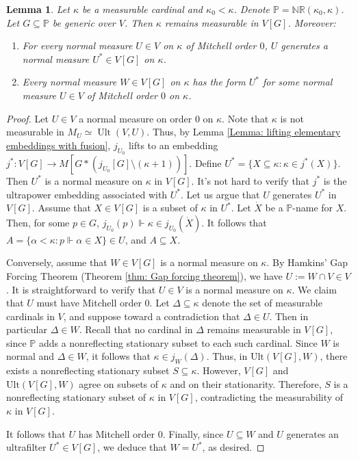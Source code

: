\documentclass[11pt]{amsart}
\newtheorem{lemma}[theorem]{Lemma}
\theoremstyle{definition}
\theoremstyle{remark}
\newcommand\<{{<}}
\DeclareMathOperator{\Ult}{Ult}
\newcommand{\po}{\mathbb{P}}
\begin{document}
\begin{lemma} \label{lemma: normal measures after iterating NRs}
    Let $\kappa$ be a measurable cardinal and  $\kappa_0<\kappa$. Denote $\po = \mathbb{NR}(\kappa_0, \kappa)$. Let $G\subseteq \po$ be generic over $V$. Then $\kappa$ remains measurable in $V[G]$. Moreover:
    \begin{enumerate}
        \item For every normal measure $U\in V$ on $\kappa$ of Mitchell order $0$, $U$ generates a normal measure $U^*\in V[G]$ on $\kappa$.
        \item Every normal measure $W\in V[G]$ on $\kappa$ has the form $U^*$ for some normal measure $U\in V$ of Mitchell order $0$ on $\kappa$.
    \end{enumerate}
\end{lemma}

\begin{proof}
    Let $U\in V$ a normal measure on order $0$ on $\kappa$. Note that $\kappa$ is not measurable in $M_U\simeq \Ult(V, U)$. Thus, by Lemma \ref{Lemma: lifting elementary embeddings with fusion}, $j_{U_0}$ lifts to an embedding $j^*\colon V[G]\to M[G*(j_{U_0}[G]\setminus (\kappa+1))]$. Define $U^* = \{ X\subseteq \kappa \colon \kappa\in j^*(X)\}$. Then $U^*$ is a normal measure on $\kappa$ in $V[G]$. It's not hard to verify that $j^*$ is the ultrapower embedding associated with $U^*$. Let us argue that $U$ generates $U^*$ in $V[G]$. Assume that $X\in V[G]$ is a subset of $\kappa$ in $U^*$. Let $\dot{X}$ be a $\po$-name for $X$. Then, for some $p\in G$, $j_{U_0}(p)\Vdash \kappa\in j_{U_0}(\dot{X})$. It follows that $A = \{ \alpha<\kappa \colon p\Vdash \alpha\in X \}\in U$, and $A\subseteq X$.

    Conversely, assume that $W \in V[G]$ is a normal measure on $\kappa$. By Hamkins' Gap Forcing Theorem (Theorem \ref{thm: Gap forcing theorem}), we have $U := W \cap V \in V$. It is straightforward to verify that $U \in V$ is a normal measure on $\kappa$. We claim that $U$ must have Mitchell order $0$. Let $\Delta \subseteq \kappa$ denote the set of measurable cardinals in $V$, and suppose toward a contradiction that $\Delta \in U$. Then in particular $\Delta \in W$. Recall that no cardinal in $\Delta$ remains measurable in $V[G]$, since $\mathbb{P}$ adds a nonreflecting stationary subset to each such cardinal. Since $W$ is normal and $\Delta \in W$, it follows that $\kappa \in j_W(\Delta)$. Thus, in $\mathrm{Ult}(V[G], W)$, there exists a nonreflecting stationary subset $S \subseteq \kappa$.    However, $V[G]$ and $\mathrm{Ult}(V[G], W)$ agree on subsets of $\kappa$ and on their stationarity. Therefore, $S$ is a nonreflecting stationary subset of $\kappa$ in $V[G]$, contradicting the measurability of $\kappa$ in $V[G]$. 
    
    It follows that $U$ has Mitchell order $0$. Finally, since $U\subseteq W$ and $U$ generates an ultrafilter $U^*\in V[G]$, we deduce that $W = U^*$, as desired.
\end{proof}
    
\end{document}

